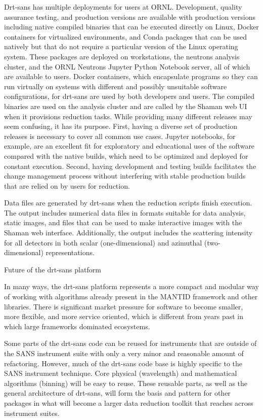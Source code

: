 Drt-sans has multiple deployments for users at ORNL. Development, quality assurance testing, and
production versions are available with production versions including native compiled binaries that
can be executed directly on Linux, Docker containers for virtualized environments, and Conda
packages that can be used natively but that do not require a particular version of the Linux
operating system. These packages are deployed on workstations, the neutrons analysis cluster, and
the ORNL Neutrons Jupyter Python Notebook server, all of which are available to users. Docker
containers, which encapsulate programs so they can run virtually on systems with different and
possibly unsuitable software configurations, for drt-sans are used by both developers and users. The
compiled binaries are used on the analysis cluster and are called by the Shaman web UI when it
provisions reduction tasks. While providing many different releases may seem confusing, it has its
purpose. First, having a diverse set of production releases is necessary to cover all common use
cases. Jupyter notebooks, for example, are an excellent fit for exploratory and educational uses of
the software compared with the native builds, which need to be optimized and deployed for constant
execution. Second, having development and testing builds facilitates the change management process
without interfering with stable production builds that are relied on by users for reduction.

Data files are generated by drt-sans when the reduction scripts finish execution. The output
includes numerical data files in formats suitable for data analysis, static images, and files that
can be used to make interactive images with the Shaman web interface. Additionally, the output
includes the scattering intensity for all detectors in both scalar (one-dimensional) and azimuthal
(two-dimensional) representations. 

Future of the drt-sans platform 

In many ways, the drt-sans platform represents a more compact and modular way of working with
algorithms already present in the MANTID framework and other libraries. There is significant market
pressure for software to become smaller, more flexible, and more service oriented, which is
different from years past in which large frameworks dominated ecosystems. 

Some parts of the drt-sans code can be reused for instruments that are outside of the SANS
instrument suite with only a very minor and reasonable amount of refactoring. However, much of the
drt-sans code base is highly specific to the SANS instrument technique. Core physical (wavelength)
and mathematical algorithms (binning) will be easy to reuse. These reusable parts, as well as the
general architecture of drt-sans, will form the basis and pattern for other packages in what will
become a larger data reduction toolkit that reaches across instrument suites. 

